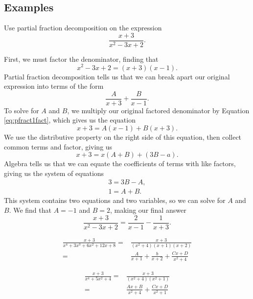 \subsection{Examples}

\begin{ex}
  Use partial fraction decomposition on the expression
  \[ \frac{x+3}{x^2-3x+2}.\]
  \begin{sol}
    First, we must factor the denominator, finding that
    \begin{equation}
      x^2-3x+2 = (x+3)(x-1).
      \label{eq:pfract1fact}
    \end{equation}
    Partial fraction decomposition tells us that we can break apart our original expression into terms of the form
    \[ \frac{A}{x+3}+\frac{B}{x-1}. \]
    To solve for $A$ and $B$, we multiply our original factored denominator by Equation \eqref{eq:pfract1fact}, which gives us the equation
    \begin{equation}
      x+3 = A(x-1)+B(x+3).
    \end{equation}
    We use the distributive property on the right side of this equation, then collect common terms and factor, giving us
    \begin{equation}
      x+3=x(A+B)+(3B-a).
      \label{pfract1terms}
    \end{equation}
    Algebra tells us that we can equate the coefficients of terms with like factors, giving us the system of equations
    \begin{align*}
      3=3B-A, \\
      1=A+B.
    \end{align*}
    This system contains two equations and two variables, so we can solve for $A$ and $B$.
    We find that $A=-1$ and $B=2$, making our final answer
    \begin{equation}
      \frac{x+3}{x^2-3x+2}=\frac{2}{x-1}-\frac{1}{x+3}.
    \end{equation}
  \end{sol}
\end{ex}
\begin{ex}
  \begin{align*}
    \frac {x+3} {x^4+3x^3+6x^2+12x+8}
    =&\frac {x+3} {(x^2+4)(x+1)(x+2)} \\
    =&\frac{A}{x+1}+\frac{b}{x+2}+\frac{Cx+D}{x^2+4}
  \end{align*}
\end{ex}
\begin{ex}
  \begin{align*}
    \frac{x+3}{x^4+5x^2+4}
    =&\frac{x+3}{(x^2+4)(x^2+1)}\\
    =&\frac{Ax+B}{x^2+4}+\frac{Cx+D}{x^2+1}
  \end{align*}
\end{ex}

